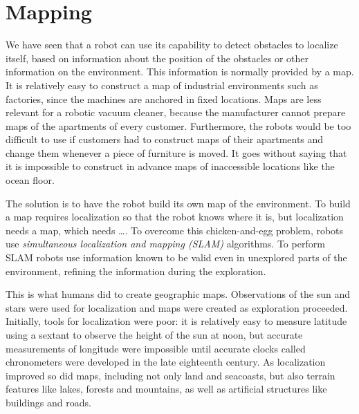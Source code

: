 
\chapter{Mapping}\label{ch.mapping}


We have seen that a robot can use its capability to detect obstacles to localize itself, based on information about the position of the obstacles or other information on the environment. This information is normally provided by a map. It is relatively easy to construct a map of industrial environments such as factories, since the machines are anchored in fixed locations. Maps are less relevant for a robotic vacuum cleaner, because the manufacturer cannot prepare maps of the apartments of every customer. Furthermore, the robots would be too difficult to use if customers had to construct maps of their apartments and change them whenever a piece of furniture is moved. It goes without saying that it is impossible to construct in advance maps of inaccessible locations like the ocean floor.

The solution is to have the robot build its own map of the environment. To build a map requires localization so that the robot knows where it is, but localization needs a map, which needs \ldots. To overcome this chicken-and-egg problem, robots use \emph{simultaneous localization and mapping (SLAM)} algorithms. To perform SLAM robots use information known to be valid even in unexplored parts of the environment, refining the information during the exploration.

This is what humans did to create geographic maps. Observations of the sun and stars were used for localization and maps were created as exploration proceeded. Initially, tools for localization were poor: it is relatively easy to measure latitude using a sextant to observe the height of the sun at noon, but accurate measurements of longitude were impossible until accurate clocks called chronometers were developed in the late eighteenth century. As localization improved so did maps, including not only land and seacoasts, but also terrain features like lakes, forests and mountains, as well as artificial structures like buildings and roads.

